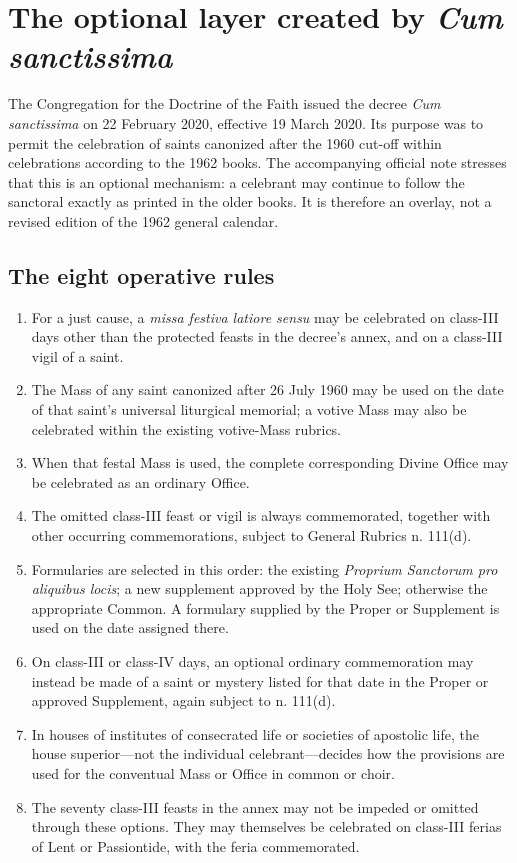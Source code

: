 \section{The optional layer created by \emph{Cum sanctissima}}

The Congregation for the Doctrine of the Faith issued the decree \emph{Cum sanctissima} on 22 February 2020, effective 19 March 2020. Its purpose was to permit the celebration of saints canonized after the 1960 cut-off within celebrations according to the 1962 books. The accompanying official note stresses that this is an optional mechanism: a celebrant may continue to follow the sanctoral exactly as printed in the older books. It is therefore an overlay, not a revised edition of the 1962 general calendar.

\subsection{The eight operative rules}

\begin{enumerate}[leftmargin=1.7em,itemsep=0.45em]
\item For a just cause, a \emph{missa festiva latiore sensu} may be celebrated on class-III days other than the protected feasts in the decree's annex, and on a class-III vigil of a saint.
\item The Mass of any saint canonized after 26 July 1960 may be used on the date of that saint's universal liturgical memorial; a votive Mass may also be celebrated within the existing votive-Mass rubrics.
\item When that festal Mass is used, the complete corresponding Divine Office may be celebrated as an ordinary Office.
\item The omitted class-III feast or vigil is always commemorated, together with other occurring commemorations, subject to General Rubrics n. 111(d).
\item Formularies are selected in this order: the existing \emph{Proprium Sanctorum pro aliquibus locis}; a new supplement approved by the Holy See; otherwise the appropriate Common. A formulary supplied by the Proper or Supplement is used on the date assigned there.
\item On class-III or class-IV days, an optional ordinary commemoration may instead be made of a saint or mystery listed for that date in the Proper or approved Supplement, again subject to n. 111(d).
\item In houses of institutes of consecrated life or societies of apostolic life, the house superior---not the individual celebrant---decides how the provisions are used for the conventual Mass or Office in common or choir.
\item The seventy class-III feasts in the annex may not be impeded or omitted through these options. They may themselves be celebrated on class-III ferias of Lent or Passiontide, with the feria commemorated.
\end{enumerate}

